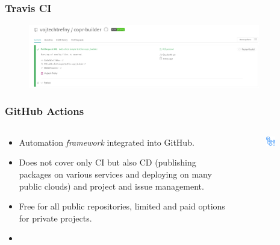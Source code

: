 \documentclass[aspectratio=169]{beamer}
\begin{document}
\begin{frame}
	\frametitle{Travis CI}
	\begin{figure}[ht!]
	\begin{center}
  	  \includegraphics[width=0.9\textwidth]{img/travis-3.png}
	\end{center}
	\end{figure}
\end{frame}

\begin{frame}
	\frametitle{GitHub Actions}
	
	\begin{columns}
\begin{column}{0.6\textwidth}
	\begin{block}{}
		\begin{itemize}
			\item Automation \emph{framework} integrated into GitHub.
			\item Does not cover only CI but also CD (publishing packages on various services and deploying on many public clouds) and project and issue management.
			\item Free for all public repositories, limited and paid options for private projects.
			\item {}
		\end{itemize}
	\end{block}
\end{column}
\begin{column}{0.4\textwidth}
	\begin{figure}[ht!]
	\begin{center}
  	  \includegraphics[width=0.5\textwidth]{img/gh-actions-logo.png}
	\end{center}
	\end{figure}
\end{column}
\end{columns}

\end{frame}
\end{document}
